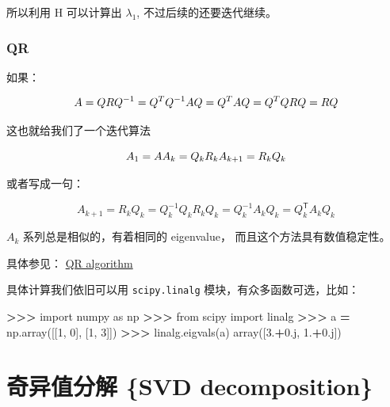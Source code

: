 \documentclass[
]{book}
\newenvironment{Shaded}{\begin{snugshade}}{\end{snugshade}}
\newcommand{\DecValTok}[1]{\textcolor[rgb]{0.00,0.00,0.81}{#1}}
\newcommand{\FloatTok}[1]{\textcolor[rgb]{0.00,0.00,0.81}{#1}}
\newcommand{\ImportTok}[1]{#1}
\newcommand{\NormalTok}[1]{#1}
\newcommand{\OperatorTok}[1]{\textcolor[rgb]{0.81,0.36,0.00}{\textbf{#1}}}
\newcommand{\OtherTok}[1]{\textcolor[rgb]{0.56,0.35,0.01}{#1}}
\begin{document}
所以利用 H 可以计算出 \(\lambda_1\), 不过后续的还要迭代继续。

\hypertarget{qr}{%
\subsection{QR}\label{qr}}

如果：

\[A = QR\\
Q^{-1} = Q^{T} \\
Q^{-1}AQ = Q^TAQ  = Q^T QR Q = RQ
\]

这也就给我们了一个迭代算法

\[
A_1 = A \\
A_k = Q_kR_k\\
A_{k+1} = R_kQ_k
\]

或者写成一句：

\[{\displaystyle A_{k+1}=R_{k}Q_{k}=Q_{k}^{-1}Q_{k}R_{k}Q_{k}=Q_{k}^{-1}A_{k}Q_{k}=Q_{k}^{\mathsf {T}}A_{k}Q_{k}}\]

\(A_k\) 系列总是相似的，有着相同的 eigenvalue， 而且这个方法具有数值稳定性。

具体参见： \href{https://en.wikipedia.org/wiki/QR_algorithm}{QR algorithm}

具体计算我们依旧可以用 \texttt{scipy.linalg} 模块，有众多函数可选，比如：

\begin{Shaded}
\begin{Highlighting}[]
\OperatorTok{\textgreater{}\textgreater{}\textgreater{}} \ImportTok{import}\NormalTok{ numpy }\ImportTok{as}\NormalTok{ np}
\OperatorTok{\textgreater{}\textgreater{}\textgreater{}} \ImportTok{from}\NormalTok{ scipy }\ImportTok{import}\NormalTok{ linalg}
\OperatorTok{\textgreater{}\textgreater{}\textgreater{}}\NormalTok{ a }\OperatorTok{=}\NormalTok{ np.array([[}\DecValTok{1}\NormalTok{, }\DecValTok{0}\NormalTok{], [}\DecValTok{1}\NormalTok{, }\DecValTok{3}\NormalTok{]])}
\OperatorTok{\textgreater{}\textgreater{}\textgreater{}}\NormalTok{ linalg.eigvals(a)}
\NormalTok{array([}\FloatTok{3.}\OperatorTok{+}\OtherTok{0.j}\NormalTok{, }\FloatTok{1.}\OperatorTok{+}\OtherTok{0.j}\NormalTok{])}
\end{Highlighting}
\end{Shaded}

\hypertarget{ux5947ux5f02ux503cux5206ux89e3-svd-decomposition}{%
\chapter{奇异值分解 \{SVD decomposition\}}\label{ux5947ux5f02ux503cux5206ux89e3-svd-decomposition}}
\end{document}
